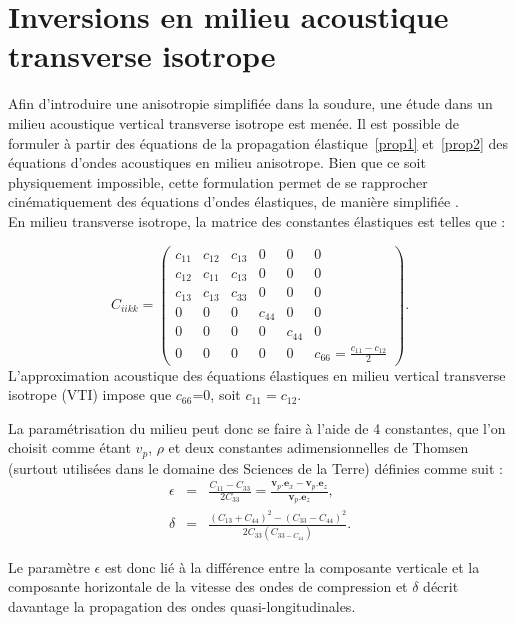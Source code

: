 \section{Inversions en milieu acoustique transverse isotrope}
Afin d'introduire une anisotropie simplifiée dans la soudure, une étude dans un milieu acoustique vertical transverse isotrope est menée.
Il est possible de formuler à partir des équations de la propagation élastique~\ref{prop1} et~\ref{prop2} des équations d'ondes acoustiques en milieu anisotrope. Bien que ce soit physiquement impossible, cette formulation permet de se rapprocher cinématiquement des équations d'ondes élastiques, de manière simplifiée \citep{alkhalifah}.\\
En milieu transverse isotrope, la matrice des constantes élastiques est telles que  : 

\begin{equation}
	C_{iikk} = \begin{pmatrix}
		c_{11} & c_{12} & c_{13} & 0 & 0 & 0 \\
		c_{12} & c_{11} & c_{13} & 0 & 0 & 0 \\
		c_{13} & c_{13} & c_{33} & 0 & 0 & 0 \\
		0 & 0 & 0 & c_{44} & 0 & 0 \\
		0 & 0 & 0 & 0 &c_{44} & 0 \\
		0 & 0 & 0 & 0 & 0 & c_{66} = \frac{c_{11}-c_{12}}{2}
	\end{pmatrix}.
\end{equation}
L'approximation acoustique des équations élastiques en milieu vertical transverse isotrope (VTI) impose que $c_{66}$=0, soit $c_{11}=c_{12}$.
 

La paramétrisation du milieu peut donc se faire à l'aide de 4 constantes, que l'on choisit comme étant $v_{p}$, $\rho$ et deux constantes adimensionnelles de Thomsen~\citep{thomsen} (surtout utilisées dans le domaine des Sciences de la Terre) définies comme suit : 
\begin{eqnarray}
	\epsilon & =  & \frac{C_{11}-C_{33}}{2C_{33}} = \frac{\bm{v}_{p}.\bm{e}_{x} -  \bm{v}_{p}.\bm{e}_{z}}{\bm{v}_{p}.\bm{e}_{z}},\\
	\delta & = & \frac{(C_{13}+C_{44})^2-(C_{33}-C_{44})^2}{2C_{33}(C_{33-C_{44}})}\text{.}
\end{eqnarray}

Le paramètre $\epsilon$ est donc lié à la différence entre la composante verticale et la composante horizontale de la vitesse des ondes de compression et $\delta$ décrit davantage la propagation des ondes quasi-longitudinales.\\

